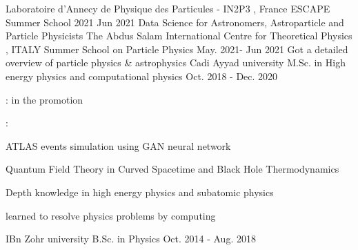 

\begin{cventries}
           \cventry
    {Laboratoire d'Annecy de Physique des Particules - IN2P3 , France} %
        {ESCAPE Summer School 2021 } %
    {} %
    { Jun 2021} %
    {Data Science for Astronomers, Astroparticle and Particle Physicists}
           \cventry
    {The Abdus Salam International Centre for Theoretical Physics , ITALY} %
        {Summer School on Particle Physics} %
    {} %
    {May. 2021- Jun 2021} %
    {Got a detailed overview of particle physics \& astrophysics }
  \cventry
    {Cadi Ayyad university} 
     {M.Sc. in High energy physics and computational physics }%
    {} %
    {Oct. 2018 - Dec. 2020} %
    {
      \begin{cvitems} %
       \item {:  in the promotion}
       \item {:
        \begin{cvitems} %
        \item{ATLAS events simulation using  GAN neural network}
        \item {Quantum Field Theory in Curved Spacetime and Black Hole Thermodynamics}
        \end{cvitems}
                }
        \item {Depth knowledge in high energy physics and subatomic physics}
        \item {learned  to resolve physics problems by computing }
      \end{cvitems}
    }
      \cventry
    {IBn Zohr university} %
        {B.Sc. in Physics} %
    {} %
    {Oct. 2014 - Aug. 2018} %
    {}
\end{cventries}
